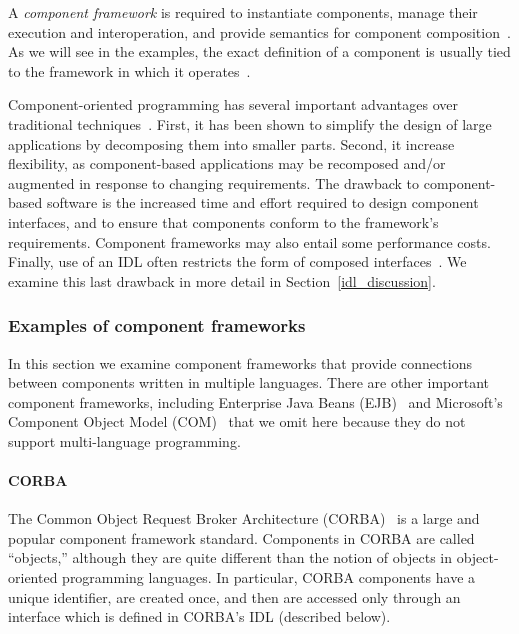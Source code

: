 A \emph{component framework} is required to instantiate components, manage their execution and interoperation, and provide semantics for component composition~\cite{nierstrasz95composition}. As we will see in the examples, the exact definition of a component is usually tied to the framework in which it operates~\cite{hopkins00component}.

Component-oriented programming has several important advantages
over traditional techniques~\cite{nierstrasz95composition}. First,
it has been shown to simplify the design of large applications by
decomposing them into smaller parts. Second, it increase
flexibility, as component-based applications may be recomposed
and/or augmented in response to changing requirements. The
drawback to component-based software is the increased time and
effort required to design component interfaces, and to ensure that
components conform to the framework's requirements. Component
frameworks may also entail some performance costs. Finally, use of
an IDL often restricts the form of composed
interfaces~\cite{kaplan98idl}. We examine this last drawback in
more detail in Section~\ref{idl_discussion}.


\subsubsection{Examples of component frameworks}

In this section we examine component frameworks that provide connections between components written in multiple languages. There are other important component frameworks, including Enterprise Java Beans (EJB)~\cite{demichiel06ejb, panda07ejb} and Microsoft's Component Object Model (COM)~\cite{comobjects} that we omit here because they do not support multi-language programming.

\paragraph{CORBA}

The Common Object Request Broker Architecture (CORBA)~\cite{vinoski97corba} is a large and popular component framework standard. Components in CORBA are called ``objects,'' although they are quite different than the notion of objects in object-oriented programming languages. In particular, CORBA components have a unique identifier, are created once, and then are accessed only through an interface which is defined in CORBA's IDL (described below).

